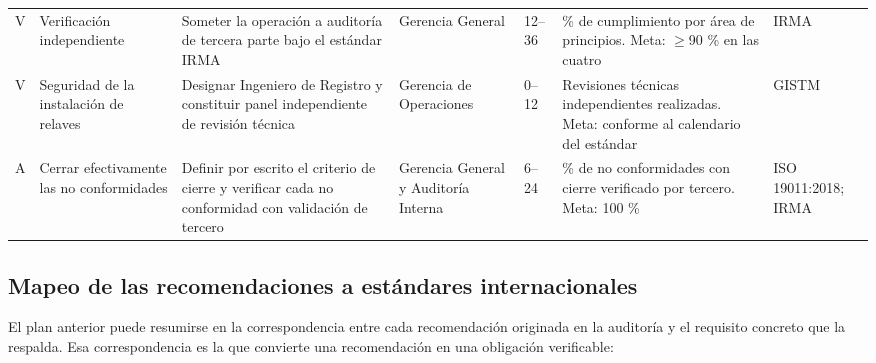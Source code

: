 \begin{landscape}
\begin{footnotesize}
\begin{longtable}{@{}L{0.8cm} L{3.6cm} L{4.6cm} L{2.6cm} L{2.0cm} L{4.6cm} L{3.0cm}@{}}
  V & Verificación independiente &
  Someter la operación a auditoría de tercera parte bajo el estándar {IRMA} &
  Gerencia General & 12--36 &
  \% de cumplimiento por área de principios. Meta: $\geq$90 \% en las cuatro &
  {IRMA} \\
  \addlinespace

  V & Seguridad de la instalación de relaves &
  Designar Ingeniero de Registro y constituir panel independiente de revisión
  técnica &
  Gerencia de Operaciones & 0--12 &
  Revisiones técnicas independientes realizadas. Meta: conforme al calendario
  del estándar &
  {GISTM} \\
  \addlinespace

  A & Cerrar efectivamente las no conformidades &
  Definir por escrito el criterio de cierre y verificar cada no conformidad con
  validación de tercero &
  Gerencia General y Auditoría Interna & 6--24 &
  \% de no conformidades con cierre verificado por tercero. Meta: 100 \% &
  {ISO} 19011:2018; {IRMA} \\

\end{longtable}
\end{footnotesize}
\end{landscape}

\subsection{Mapeo de las recomendaciones a estándares internacionales}

El plan anterior puede resumirse en la correspondencia entre cada recomendación
originada en la auditoría y el requisito concreto que la respalda. Esa
correspondencia es la que convierte una recomendación en una obligación
verificable:


